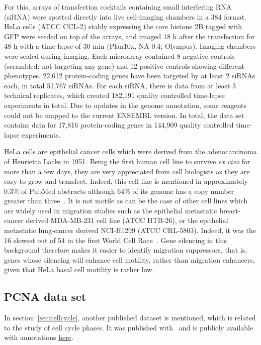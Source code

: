 For this, arrays of transfection cocktails containing small interfering RNA (siRNA) were spotted directly into live cell-imaging chambers in a 384 format. HeLa cells (ATCC\up{\textregistered} CCL-2\texttrademark) stably expressing the core histone 2B tagged with GFP were seeded on top of the arrays, and imaged 18 h after the transfection for 48 h with a time-lapse of 30 min (Plan10x, NA 0.4; Olympus). Imaging chambers were sealed during imaging. Each microarray contained 8 negative controls (scrambled: not targeting any gene) and 12 positive controls showing different phenotypes. 
22,612 protein-coding genes have been targeted by at least 2 siRNAs each, in total 51,767 siRNAs. For each siRNA, there is data from at least 3 technical replicates, which created 182,191 quality controlled time-lapse experiments in total. Due to updates in the genome annotation, some reagents could not be mapped to the current ENSEMBL version. In total, the data set contains data for 17,816 protein-coding genes in 144,909 quality controlled time-lapse
experiments.  

HeLa cells are epithelial cancer cells which were derived from the adenocarcinoma of Henrietta Lacks in 1951. Being the first human cell line to survive \textit{ex vivo} for more than a few days, they are very appreciated from cell biologists as they are easy to grow and transfect. Indeed, this cell line is mentioned in approximately 0.3\% of PubMed abstracts although 64\% of its genome has a copy number greater than three~\cite{pmid23925245}. It is not motile as can be the case of other cell lines which are widely used in migration studies such as the epithelial metastatic breast-cancer derived MDA-MB-231 cell line (ATCC\up{\textregistered} HTB-26\texttrademark), or the epithelial metastatic lung-cancer derived NCI-H1299 (ATCC\up{\textregistered} CRL-5803\texttrademark). Indeed, it was the 16 slowest out of 54 in the first World Cell Race~\cite{pmid22974990}. Gene silencing in this background therefore makes it easier to identify migration suppressors, that is, genes whose silencing will enhance cell motility, rather than migration enhancers, given that HeLa basal cell motility is rather low.

\subsection{PCNA data set}
In section~\ref{sec:cellcycle}, another published dataset is mentioned, which is related to the study of cell cycle phases. It was published with~\cite{cellcognition} and is publicly available with annotations \href{http://www.cellcognition.org/downloads/data}{here}.

